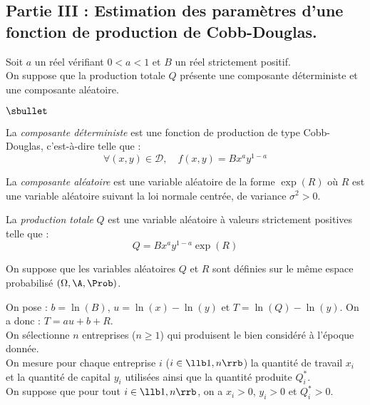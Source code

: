 \subsection*{Partie III : Estimation des paramètres d'une fonction de 
production de Cobb-Douglas.}
\noindent 
Soit $a$ un réel vérifiant $0 < a < 1$ et $B$ un réel 
strictement positif.\\
On suppose que la production totale $Q$ présente une composante 
déterministe et une composante aléatoire.
\begin{noliste}{$\sbullet$}
 \item La {\it composante déterministe} est une fonction de 
 production de type Cobb-Douglas, c'est-à-dire telle que :
 \[
  \forall (x,y) \in \mathcal{D},\quad f(x,y)=Bx^ay^{1-a}
 \]
 
 \item La {\it composante aléatoire} est une variable aléatoire de la 
 forme $\exp(R)$ où $R$ est une variable aléatoire suivant la loi 
 normale centrée, de variance $\sigma^2>0$.
 
 \item La {\it production totale} $Q$ est une variable aléatoire à 
 valeurs strictement positives telle que :
 \[
  Q=Bx^ay^{1-a} \exp(R)
 \]
\end{noliste}
On suppose que les variables aléatoires $Q$ et $R$ sont définies sur 
le même espace probabilisé $(\Omega,\A,\Prob)$.



\noindent
On pose : $b=\ln(B)$, $u=\ln(x) - \ln(y)$ et $T=\ln(Q)-\ln(y)$. On a 
donc : $T=au+b+R$.\\
On sélectionne $n$ entreprises ($n \geq 1$) qui produisent le bien 
considéré à l'époque donnée.\\
On mesure pour chaque entreprise $i$ ($i \in \llb 1,n \rrb$) la 
quantité de travail $x_i$ et la quantité de capital $y_i$ utilisées
ainsi que la quantité produite $Q_i^*$.\\
On suppose que pour tout $i \in \llb 1,n \rrb$, on a $x_i>0$, $y_i>0$ 
et $Q_i^*>0$.






